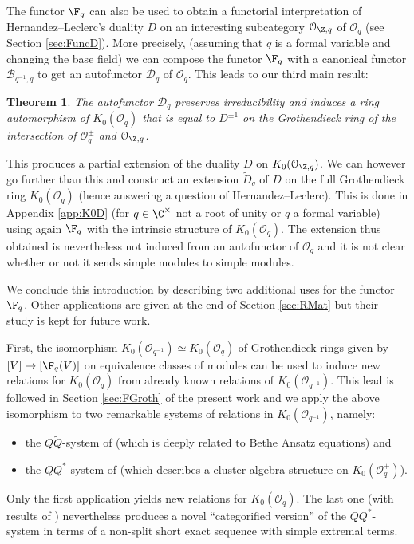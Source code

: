 \documentclass[11pt]{amsart}
\newtheorem{theorem}{Theorem}[section]
\theoremstyle{definition}
\theoremstyle{remark}
\numberwithin{equation}{section}
\begin{document}
The functor $\F_q$ can also be used to obtain a functorial interpretation of Hernandez--Leclerc's duality $D$ on an interesting subcategory $\mathcal{O}_{\Z,q}$ of $\mathcal{O}_q$ (see Section \ref{sec:FuncD}). More precisely, (assuming that $q$ is a formal variable and changing the base field) we can compose the functor $\F_q$ with a canonical functor $\mathcal{B}_{q^{-1},q}$ to get an autofunctor $\mathcal{D}_q$ of $\mathcal{O}_q$. This leads to our third main result:
\begin{theorem}\label{thm:DCatIntro}
The autofunctor $\mathcal{D}_q$ preserves irreducibility and induces a ring automorphism of $K_0(\mathcal{O}_q)$ that is equal to $D^{\pm 1}$ on the Grothendieck ring of the intersection of $\mathcal{O}^{\pm}_q$ and $\mathcal{O}_{\Z,q}$.
\end{theorem}
This produces a partial extension of the duality
$D$ on $K_0(\mathcal{O}_{\Z,q})$. We can however go further than this and construct an extension $\tilde{D}_q$ of $D$ on the full Grothendieck ring $K_0(\mathcal{O}_q)$ (hence answering a question of Hernandez--Leclerc). This is done in Appendix \ref{app:K0D} (for $q\in \C^{\times}$ not a root of unity or $q$ a formal variable) using again 
$\F_q$ with the intrinsic structure of $K_{0}(\mathcal{O}_q)$. The extension thus obtained is nevertheless not induced from an autofunctor of $\mathcal{O}_q$ and it is not clear whether or not it sends simple modules to simple modules. \par
We conclude this introduction by describing two additional uses for the functor $\F_q$. Other applications are given at the end of Section \ref{sec:RMat} but their study is kept for future work.
\par First, the 
isomorphism $K_0(\mathcal{O}_{q^{-1}})\simeq K_0(\mathcal{O}_q)$ of Grothendieck rings given by $[V] \mapsto [\F_q(V)]$ on equivalence classes of modules can be used to induce new relations for $K_0(\mathcal{O}_q)$ from already known relations of $K_0(\mathcal{O}_{q^{-1}})$. This lead is followed in Section \ref{sec:FGroth} of the present work and we apply the above isomorphism to two remarkable systems of relations in $K_0(\mathcal{O}_{q^{-1}})$, namely:
\begin{itemize}
\item[1.] the $Q\widetilde{Q}$-system of \cite{fh2} (which is deeply related to Bethe Ansatz equations) and 
\item[2.] the $QQ^*$-system of \cite{hl2} (which describes a cluster algebra structure on $K_0(\mathcal{O}_q^+)$).
\end{itemize} Only the first application yields new relations for $K_0(\mathcal{O}_q)$. The last one (with results of \cite{her}) nevertheless produces a novel ``categorified version'' of the $QQ^*$-system in terms of a non-split short exact sequence with simple extremal terms.
\end{document}
